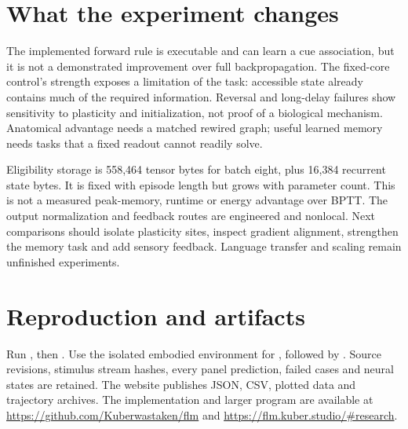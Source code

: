 \documentclass[10pt]{article}
\begin{document}
\section{What the experiment changes}
The implemented forward rule is executable and can learn a cue association, but
it is not a demonstrated improvement over full backpropagation. The fixed-core
control's strength exposes a limitation of the task: accessible state already
contains much of the required information. Reversal and long-delay failures
show sensitivity to plasticity and initialization, not proof of a biological
mechanism. Anatomical advantage needs a matched rewired graph; useful learned
memory needs tasks that a fixed readout cannot readily solve.

Eligibility storage is 558,464 tensor bytes for batch eight, plus 16,384 recurrent
state bytes. It is fixed with episode length but grows with parameter count.
This is not a measured peak-memory, runtime or energy advantage over BPTT.
The output normalization and feedback routes are engineered and nonlocal.
Next comparisons should isolate plasticity sites, inspect gradient alignment,
strengthen the memory task and add sensory feedback. Language transfer and
scaling remain unfinished experiments.

\section{Reproduction and artifacts}
Run , then
. Use the isolated embodied environment for
, followed by
. Source revisions, stimulus stream
hashes, every panel prediction, failed cases and neural states are retained.
The website publishes JSON, CSV, plotted data and trajectory archives.
The implementation and larger program are available at
\url{https://github.com/Kuberwastaken/flm} and
\url{https://flm.kuber.studio/#research}.


\end{document}
